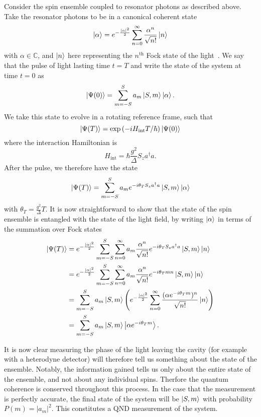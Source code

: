 \documentclass{article}
\begin{document}
Consider the spin ensemble coupled to resonator photons as described above. Take
the resonator photons to be in a canonical coherent state~\cite{}
%
\begin{equation}
  \ket{\alpha} = e^{-\frac{|\alpha|^2}{2}}\sum_{n=0}^\infty \frac{\alpha^n}{\sqrt{n!}} \ket{n}
\end{equation}
%
with $\alpha\in\mathbb{C}$, and $\ket{n}$ here representing the $n^\text{th}$
Fock state of the light~\cite{}. We say that the pulse of light lasting time
$t=T$ and  write the state of the system at time $t=0$ as
%
\begin{equation}
  \ket{\Psi(0)} = \sum_{m=-S}^S a_m \ket{S, m}\ket{\alpha}.
\end{equation}
%
We take this state to evolve in a rotating reference frame, such that
%
\begin{equation}
  \ket{\Psi(T)} = \exp\left(-iH_\text{int}T/\hbar\right)\ket{\Psi(0)}
\end{equation}
%
where the interaction Hamiltonian is
%
\begin{equation}
  H_\text{int} = \hbar \frac{g^2}{\Delta} S_z a^\dagger a.
\end{equation}
%
After the pulse, we therefore have the state
%
\begin{equation}
  \ket{\Psi(T)} = \sum_{m=-S}^S a_m e^{-i\theta_T S_z
  a^\dagger a} \ket{S, m}\ket{\alpha}
\end{equation}
%
with $\theta_T = \frac{g^2}{\Delta} T$. It is now straightforward to show that
the state of the spin ensemble is entangled with the state of the light field,
by writing $\ket{\alpha}$ in terms of the summation over Fock states
%
\begin{align}
  \ket{\Psi(T)} &= e^{-\frac{|\alpha|^2}{2}}\sum_{m=-S}^S \sum_{n=0}^\infty a_m
   \frac{\alpha^n}{\sqrt{n!}} e^{-i\theta_T S_z a^\dagger a} \ket{S, m} \ket{n}
   \\
  &= e^{-\frac{|\alpha|^2}{2}}\sum_{m=-S}^S \sum_{n=0}^\infty a_m
  \frac{\alpha^n}{\sqrt{n!}} e^{-i\theta_T m n} \ket{S, m} \ket{n} \\
  &= \sum_{m=-S}^S a_m \ket{S, m} \left( e^{-\frac{|\alpha|^2}{2}}
  \sum_{n=0}^\infty \frac{(\alpha e^{-i\theta_T m})^n}{\sqrt{n!}}\ket{n}\right)
  \\
  &= \sum_{m=-S}^S a_m \ket{S, m}\ket{\alpha e^{-i\theta_T m}}.
\end{align}

It is now clear measuring the phase of the light leaving the cavity
(for example with a heterodyne detector) will therefore tell us something about
the state of the ensemble. Notably, the information gained tells us only about
the entire state of the ensemble, and not about any individual spins. Therfore
the quantum coherence is conserved throughout this process.
In the case that the measurement is perfectly accurate, the final state of the
system will be $\ket{S, m}$ with probability $P(m) = |a_m|^2$. This constitutes
a QND measurement of the system. %
\end{document}

